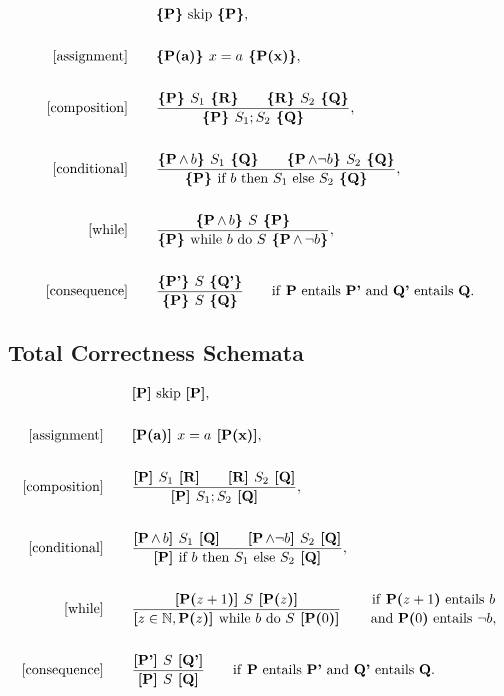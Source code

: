 \begin{align*}
  [\text{skip}]& \qquad \textbf{\{P\}} \text{ skip } \textbf{\{P\}}, \\ \\
  [\text{assignment}]& \qquad \textbf{\{P(a)\} } x = a \textbf{ \{P(x)\}}, \\ \\
  [\text{composition}]& \qquad \frac{
    \textbf{\{P\} } S_1 \textbf{ \{R\}} \qquad
    \textbf{\{R\} } S_2 \textbf{ \{Q\}}
  }{
    \textbf{\{P\} } S_1; S_2 \textbf{ \{Q\}}
  }, \\ \\
  [\text{conditional}]& \qquad \frac{
    \textbf{\{P$\, \land \, b$\} } S_1 \textbf{ \{Q\}} \qquad
    \textbf{\{P$\, \land \neg b$\} } S_2 \textbf{ \{Q\}}
  }{
    \textbf{\{P\} } \text{if } b \text{ then } S_1 \text{ else } S_2 \textbf{ \{Q\}}
  }, \\ \\
  [\text{while}]& \qquad \frac{
    \textbf{\{P$\, \land \, b$\} } S \textbf{ \{P\}}
  }{
    \textbf{\{P\} } \text{while } b \text{ do } S \textbf{ \{P$\, \land \, \neg b$\}}
  }, \\ \\
  [\text{consequence}]& \qquad \frac{
    \textbf{\{P'\} } S \textbf{ \{Q'\}}
  }{
    \textbf{\{P\} } S \textbf{ \{Q\}}
  } \qquad \text{if \textbf{P} entails \textbf{P'} and \textbf{Q'} entails \textbf{Q}}.
\end{align*}

\subsection{Total Correctness Schemata}

\begin{align*}
  [\text{skip}]& \qquad \textbf{[P]} \text{ skip } \textbf{[P]}, \\ \\
  [\text{assignment}]& \qquad \textbf{[P(a)] } x = a \textbf{ [P(x)]}, \\ \\
  [\text{composition}]& \qquad \frac{
    \textbf{[P] } S_1 \textbf{ [R]} \qquad
    \textbf{[R] } S_2 \textbf{ [Q]}
  }{
    \textbf{[P] } S_1; S_2 \textbf{ [Q]}
  }, \\ \\
  [\text{conditional}]& \qquad \frac{
    \textbf{[P$\, \land \, b$] } S_1 \textbf{ [Q]} \qquad
    \textbf{[P$\, \land \neg b$] } S_2 \textbf{ [Q]}
  }{
    \textbf{[P] } \text{if } b \text{ then } S_1 \text{ else } S_2 \textbf{ [Q]}
  }, \\ \\
  [\text{while}]& \qquad \frac{
    \textbf{[P($z + 1$)] } S \textbf{ [P($z$)]}
  }{
    \textbf{[$z \in \mathbb{N}, \, $P($z$)] } \text{while } b \text{ do } S \textbf{ [P($0$)]}
  } \qquad \bfrac{\text{if \textbf{P($z + 1$)} entails $b$}}{
    \text{and \textbf{P($0$)} entails $\neg b$},} \\ \\
  [\text{consequence}]& \qquad \frac{
    \textbf{[P'] } S \textbf{ [Q']}
  }{
    \textbf{[P] } S \textbf{ [Q]}
  } \qquad \text{if \textbf{P} entails \textbf{P'} and \textbf{Q'} entails \textbf{Q}}.
\end{align*}